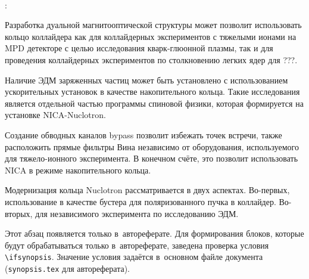 ~\\
\par {\influence}:
\par Разработка дуальной магнитооптической структуры может позволит использовать кольцо коллайдера как для коллайдерных экспериментов с тяжелыми ионами на MPD детекторе с целью исследования кварк-глюонной плазмы, так и для проведения коллайдерных экспериментов по столкновению легких ядер для ???. 
\par Наличие ЭДМ заряженных частиц может быть установлено с использованием ускорительных установок в качестве накопительного кольца. Такие исследования является отдельной частью программы спиновой физики, которая формируется на установке NICA-Nuclotron.
\par Создание обводных каналов bypass позволит избежать точек встречи, также расположить прямые фильтры Вина независимо от оборудования, используемого для тяжело-ионного эксперимента. В конечном счёте, 
это позволит использовать NICA в режиме накопительного кольца.

\par Модернизация кольца Nuclotron рассматривается в двух аспектах. Во-первых, использование в качестве бустера для поляризованного пучка в коллайдер. Во-вторых, для независимого эксперимента по исследованию ЭДМ.

\ifsynopsis
Этот абзац появляется только в~автореферате.
Для формирования блоков, которые будут обрабатываться только в~автореферате,
заведена проверка условия \verb!\!\verb!ifsynopsis!.
Значение условия задаётся в~основном файле документа (\verb!synopsis.tex! для
автореферата).
\else
\fi

